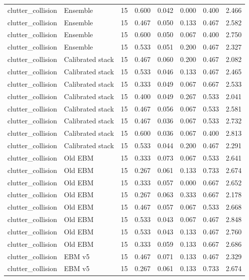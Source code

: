 {\begin{longtable}{llrrrrrr}
clutter\_collision & Ensemble & 15 & 0.600 & 0.042 & 0.000 & 0.400 & 2.466 \\
clutter\_collision & Ensemble & 15 & 0.467 & 0.050 & 0.133 & 0.467 & 2.582 \\
clutter\_collision & Ensemble & 15 & 0.600 & 0.050 & 0.067 & 0.400 & 2.750 \\
clutter\_collision & Ensemble & 15 & 0.533 & 0.051 & 0.200 & 0.467 & 2.327 \\
clutter\_collision & Calibrated stack & 15 & 0.467 & 0.060 & 0.200 & 0.467 & 2.082 \\
clutter\_collision & Calibrated stack & 15 & 0.533 & 0.046 & 0.133 & 0.467 & 2.465 \\
clutter\_collision & Calibrated stack & 15 & 0.333 & 0.049 & 0.067 & 0.667 & 2.533 \\
clutter\_collision & Calibrated stack & 15 & 0.400 & 0.049 & 0.267 & 0.533 & 2.041 \\
clutter\_collision & Calibrated stack & 15 & 0.467 & 0.056 & 0.067 & 0.533 & 2.581 \\
clutter\_collision & Calibrated stack & 15 & 0.467 & 0.036 & 0.067 & 0.533 & 2.732 \\
clutter\_collision & Calibrated stack & 15 & 0.600 & 0.036 & 0.067 & 0.400 & 2.813 \\
clutter\_collision & Calibrated stack & 15 & 0.533 & 0.044 & 0.200 & 0.467 & 2.291 \\
clutter\_collision & Old EBM & 15 & 0.333 & 0.073 & 0.067 & 0.533 & 2.641 \\
clutter\_collision & Old EBM & 15 & 0.267 & 0.061 & 0.133 & 0.733 & 2.674 \\
clutter\_collision & Old EBM & 15 & 0.333 & 0.057 & 0.000 & 0.667 & 2.652 \\
clutter\_collision & Old EBM & 15 & 0.267 & 0.063 & 0.333 & 0.667 & 2.178 \\
clutter\_collision & Old EBM & 15 & 0.467 & 0.057 & 0.067 & 0.533 & 2.668 \\
clutter\_collision & Old EBM & 15 & 0.533 & 0.043 & 0.067 & 0.467 & 2.848 \\
clutter\_collision & Old EBM & 15 & 0.533 & 0.043 & 0.133 & 0.467 & 2.760 \\
clutter\_collision & Old EBM & 15 & 0.333 & 0.059 & 0.133 & 0.667 & 2.686 \\
clutter\_collision & EBM v5 & 15 & 0.467 & 0.071 & 0.133 & 0.467 & 2.329 \\
clutter\_collision & EBM v5 & 15 & 0.267 & 0.061 & 0.133 & 0.733 & 2.674 \\

\end{longtable}}

